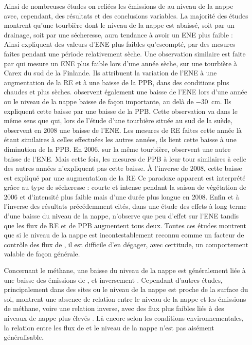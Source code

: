Ainsi de nombreuses études on reliées les émissions de \coo au niveau de la nappe avec, cependant, des résultats et des conclusions variables.
La majorité des études montrent qu'une tourbière dont le niveau de la nappe est abaissé, soit par un drainage, soit par une sécheresse, aura tendance à avoir un ENE plus faible :
Ainsi \citet{strack2013} expliquent des valeurs d'ENE plus faibles qu'escompté, par des mesures faites pendant une période relativement sèche.
Une observation similaire est faite par \citet{aurela2007} qui mesure un ENE plus faible lors d'une année sèche, sur une tourbière à Carex du sud de la Finlande.
Ils attribuent la variation de l'ENE à une augmentation de la RE et à une baisse de la PPB, dans des conditions plus chaudes et plus sèches.
\citet{peichl2014} observent également une baisse de l'ENE lors d'une année ou le niveau de la nappe baisse de façon importante, au delà de \SI{-30}{\centi\metre}.
Ils expliquent cette baisse par une baisse de la PPB.
Cette observation va dans le même sens que \citet{lund2012} qui, lors de l'étude d'une tourbière située au sud de la suède, observent en 2008 une baisse de l'ENE.
Les mesures de RE faites cette année là étant similaires à celles effectuées les autres années, ils lient cette baisse à une diminution de la PPB.
En 2006, sur la même tourbière, \citet{lund2012} observent une autre baisse de l'ENE.
Mais cette fois, les mesures de PPB à leur tour similaires à celle des autres années n'expliquent pas cette baisse.
À l'inverse de 2008, cette baisse est expliqué par une augmentation de la RE
Ce paradoxe apparent est interprété grâce au type de sécheresse : courte et intense pendant la saison de végétation de 2006 et d'intensité plus faible mais d'une durée plus longue en 2008.
Enfin et à l'inverse des résultats précédemment cités, \citet{ballantyne2014} dans une étude des effets à long terme d'une baisse du niveau de la nappe, n'observe que peu d'effet sur l'ENE tandis que les flux de RE et de PPB augmentent tous deux.
Toutes ces études montrent que si le niveau de la nappe est incontestablement reconnu comme un facteur de contrôle des flux de \coo, il est difficile d'en dégager, avec certitude, un comportement valable de façon générale.

Concernant le méthane, une baisse du niveau de la nappe est généralement liée à une baisse des émissions de \chh, et inversement \citep{strack2006,pelletier2007,turetsky2008}.
Cependant d'autres études, principalement dans des sites ou le niveau de la nappe est proche de la surface du sol, montrent une absence de relation entre le niveau de la nappe et les émissions de méthane, voire une relation inverse, avec des flux plus faibles liés à des niveaux de nappe plus élevés \citep{kettunen1996,bellisario1999,treat2007}.
Là encore selon les conditions environnementales, la relation entre les flux de \chh et le niveau de la nappe n'est pas aisément généralisable.

